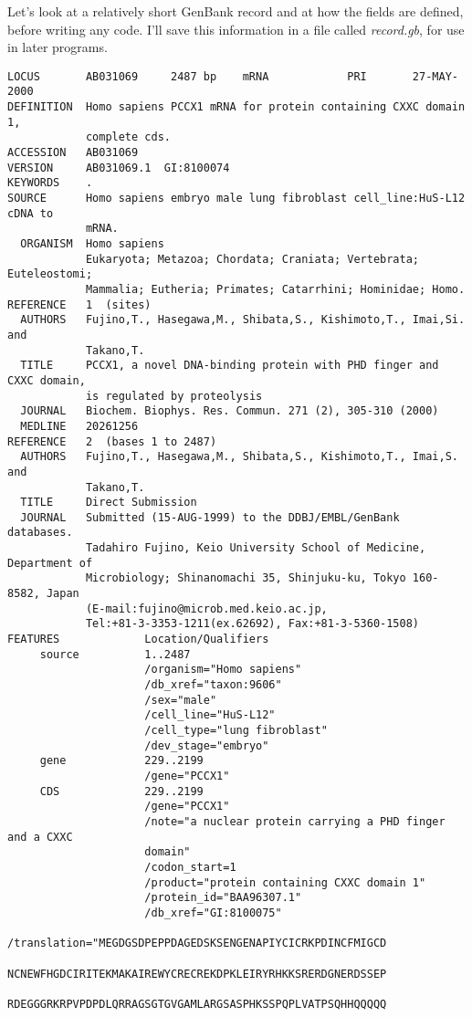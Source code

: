 Let's look at a relatively short GenBank record and at how the fields are defined, before writing any code. I'll save this information in a file called \textit{record.gb}, for use in later programs.

\begin{lstlisting}
LOCUS       AB031069     2487 bp    mRNA            PRI       27-MAY-2000
DEFINITION  Homo sapiens PCCX1 mRNA for protein containing CXXC domain 1,
            complete cds.
ACCESSION   AB031069
VERSION     AB031069.1  GI:8100074
KEYWORDS    .
SOURCE      Homo sapiens embryo male lung fibroblast cell_line:HuS-L12 cDNA to
            mRNA.
  ORGANISM  Homo sapiens
            Eukaryota; Metazoa; Chordata; Craniata; Vertebrata; Euteleostomi;
            Mammalia; Eutheria; Primates; Catarrhini; Hominidae; Homo.
REFERENCE   1  (sites)
  AUTHORS   Fujino,T., Hasegawa,M., Shibata,S., Kishimoto,T., Imai,Si. and
            Takano,T.
  TITLE     PCCX1, a novel DNA-binding protein with PHD finger and CXXC domain,
            is regulated by proteolysis
  JOURNAL   Biochem. Biophys. Res. Commun. 271 (2), 305-310 (2000)
  MEDLINE   20261256
REFERENCE   2  (bases 1 to 2487)
  AUTHORS   Fujino,T., Hasegawa,M., Shibata,S., Kishimoto,T., Imai,S. and
            Takano,T.
  TITLE     Direct Submission
  JOURNAL   Submitted (15-AUG-1999) to the DDBJ/EMBL/GenBank databases.
            Tadahiro Fujino, Keio University School of Medicine, Department of
            Microbiology; Shinanomachi 35, Shinjuku-ku, Tokyo 160-8582, Japan
            (E-mail:fujino@microb.med.keio.ac.jp,
            Tel:+81-3-3353-1211(ex.62692), Fax:+81-3-5360-1508)
FEATURES             Location/Qualifiers
     source          1..2487
                     /organism="Homo sapiens"
                     /db_xref="taxon:9606"
                     /sex="male"
                     /cell_line="HuS-L12"
                     /cell_type="lung fibroblast"
                     /dev_stage="embryo"
     gene            229..2199
                     /gene="PCCX1"
     CDS             229..2199
                     /gene="PCCX1"
                     /note="a nuclear protein carrying a PHD finger and a CXXC
                     domain"
                     /codon_start=1
                     /product="protein containing CXXC domain 1"
                     /protein_id="BAA96307.1"
                     /db_xref="GI:8100075"
                     /translation="MEGDGSDPEPPDAGEDSKSENGENAPIYCICRKPDINCFMIGCD
                     NCNEWFHGDCIRITEKMAKAIREWYCRECREKDPKLEIRYRHKKSRERDGNERDSSEP
                     RDEGGGRKRPVPDPDLQRRAGSGTGVGAMLARGSASPHKSSPQPLVATPSQHHQQQQQ

\end{lstlisting}
